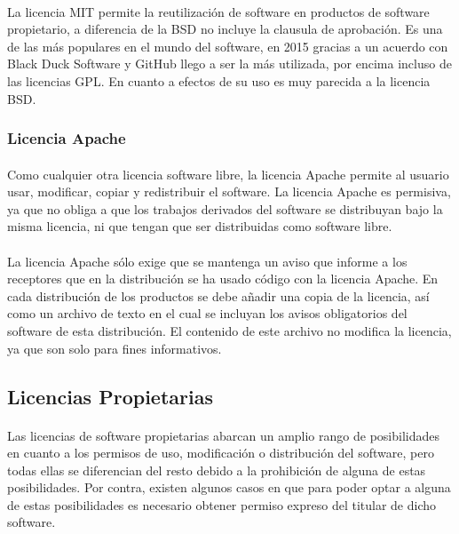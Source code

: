 \documentclass[10pt]{article}
\begin{document}
             \paragraph{}
              La licencia MIT permite la reutilización de software en productos de software propietario, a diferencia de la BSD no incluye la clausula de aprobación. Es una de las más populares en el mundo del software, en 2015 gracias a un acuerdo con Black Duck Software y GitHub llego a ser la más utilizada, por encima incluso de las licencias GPL. En cuanto a efectos de su uso es muy parecida a la licencia BSD.
              
     	\subsubsection{Licencia Apache}
        	\paragraph{}
        	Como cualquier otra licencia software libre, la licencia Apache permite al usuario usar, modificar, copiar y redistribuir el software. La licencia Apache es permisiva, ya que no obliga a que los trabajos derivados del software se distribuyan bajo la misma licencia, ni que tengan que ser distribuidas como software libre.
            
            \paragraph{}
            La licencia Apache sólo exige que se mantenga un aviso que informe a los receptores que en la distribución se ha usado código con la licencia Apache. En cada distribución de los productos se debe añadir una copia de la licencia, así como un archivo de texto en el cual se incluyan los avisos obligatorios del software de esta distribución. El contenido de este archivo no modifica la licencia, ya que son solo para fines informativos. 
                
            
        \subsection{Licencias Propietarias}

			\paragraph{}
            Las licencias de software propietarias abarcan un amplio rango de posibilidades en cuanto a los permisos de uso, modificación o distribución del software, pero todas ellas se diferencian del resto debido a la prohibición de alguna de estas posibilidades. Por contra, existen algunos casos en que para poder optar a alguna de estas posibilidades es necesario obtener permiso expreso del titular de dicho software.
\end{document}
